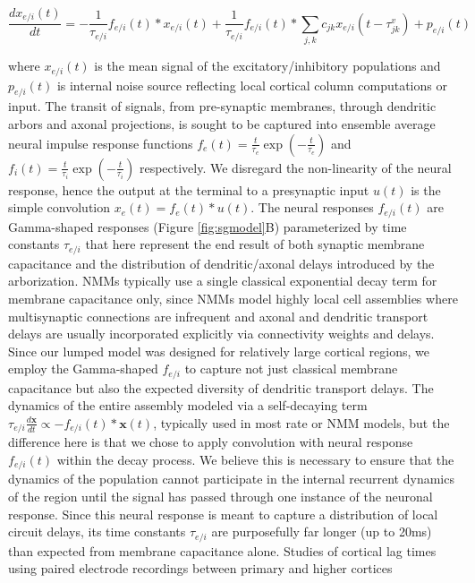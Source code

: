 \begin{equation}
\label{eq:rate_model}
\frac{dx_{e/i}(t)}{dt} = - \frac{1}{\tau_{e/i}} f_{e/i}(t) * x_{e/i}(t) + \frac{1}{\tau_{e/i}} f_{e/i}(t) * \sum_{j,k} c_{jk} x_{e/i} (t - \tau_{jk}^{v} ) + p_{e/i}(t)
\end{equation}


where $x_{e/i}(t)$ is the mean signal of the excitatory/inhibitory
populations and $p_{e/i}(t)$ is internal noise source reflecting local
cortical column computations or input. The transit of signals, from
pre-synaptic membranes, through dendritic arbors and axonal projections,
is sought to be captured into ensemble average neural impulse response
functions $f_{e}(t) = \frac{t}{\tau_{e}}\exp(-\frac{t}{\tau_{e}})$
and $f_{i}(t) = \frac{t}{\tau_{i}}\exp(-\frac{t}{\tau_{i}})$
respectively. We disregard the non-linearity of the neural response,
hence the output at the terminal to a presynaptic input $u(t)$ is the
simple convolution $x_{e}(t) = f_{e}(t)*u(t)$. The neural responses
$f_{e/i}(t)$ are Gamma-shaped responses (Figure \ref{fig:sgmodel}B)
parameterized by time constants $\tau_{e/i}$ that here represent the
end result of both synaptic membrane capacitance and the distribution of
dendritic/axonal delays introduced by the arborization. NMMs typically
use a single classical exponential decay term for membrane capacitance
only, since NMMs model highly local cell assemblies where multisynaptic
connections are infrequent and axonal and dendritic transport delays are
usually incorporated explicitly via connectivity weights and delays.
Since our lumped model was designed for relatively large cortical
regions, we employ the Gamma-shaped $f_{e/i}$ to capture not just
classical membrane capacitance but also the expected diversity of
dendritic transport delays. The dynamics of the entire assembly modeled
via a self-decaying term
$\tau_{e/i} \frac{d\mathbf{x}}{dt} \propto - f_{e/i}(t) * \mathbf{x}(t)$,
typically used in most rate or NMM models, but the difference here is
that we chose to apply convolution with neural response $f_{e/i}(t)$
within the decay process. We believe this is necessary to ensure that
the dynamics of the population cannot participate in the internal
recurrent dynamics of the region until the signal has passed through one
instance of the neuronal response. Since this neural response is meant
to capture a distribution of local circuit delays, its time constants
$\tau_{e/i}$ are purposefully far longer (up to 20ms) than expected
from membrane capacitance alone. Studies of cortical lag times using
paired electrode recordings between primary and higher cortices

